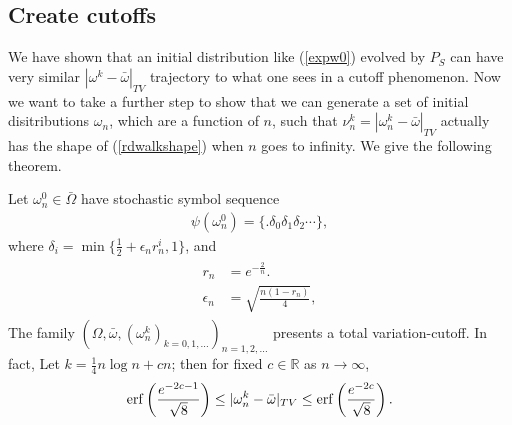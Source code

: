 \subsection{Create cutoffs}
We have shown that an initial distribution like (\ref{expw0}) evolved by $P_S$ can have very similar $|\omega^k-\bar{\omega}|_{TV}$ trajectory to what one sees in a cutoff phenomenon. Now we want to take a further step to show that we can generate a set of initial disitributions $\omega_n$, which are a function of $n$, such that $\nu_n^k = |\omega_n^k-\bar{\omega}|_{TV}$ actually has the shape of (\ref{rdwalkshape}) when $n$ goes to infinity. We give the following theorem.
\begin{theorem}
Let $\omega_n^0 \in \bar{\Omega}$ have stochastic symbol sequence
 \begin{eqnarray}
    \psi(\omega^0_n) =  \{.\delta_0 \delta_1 \delta_2 \cdots\},
 \end{eqnarray}
where $\delta_i = \min\{\frac{1}{2}+\epsilon_n r_n^i,1\}$, and
 \begin{align}
 \begin{split}
          r_n &= e^{-\frac{2}{n}}.\\
          \epsilon_n &= \sqrt{\frac{n(1-r_n)}{4}},
 \end{split}
 \end{align}
The family $(\Omega,\bar{\omega},(\omega^k_n)_{k=0,1,\ldots})_{n=1,2,\ldots}$ presents a total variation-cutoff. In fact, 
Let $k = \frac{1}{4}n\log{n}+cn $; then for fixed $c\in \mathbb{R}$ as $n\to \infty$,
\begin{eqnarray}
\label{erfbound}
          \operatorname{erf} \left(\frac{e^{-2c-1}}{\sqrt{8}}\right)\le  |\omega^k_n - \bar{\omega} |_{TV} \le \operatorname{erf} \left(\frac{e^{-2c}}{\sqrt{8}}\right).
\end{eqnarray}
\end{theorem}

